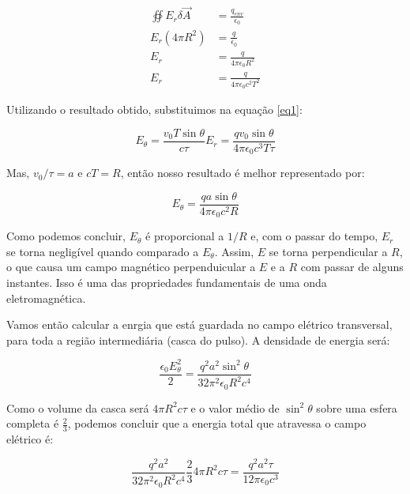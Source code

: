 \documentclass[12pt, letterpaper]{article}
\begin{document}
    \begin{equation} \label{eq2}
    \begin{split}
        \oiint E_r \delta \vec{A} &= \frac{q_{env}}{\epsilon_0} \\
        E_r(4\pi R^2) &= \frac{q}{\epsilon_0} \\
        E_r &= \frac{q}{4\pi\epsilon_0R^2} \\
        E_r &= \frac{q}{4\pi\epsilon_0c^2T^2} 
    \end{split}
    \end{equation}

    Utilizando o resultado obtido, substituimos na equação \ref{eq1}:

    \begin{equation} \label{eq3}
        E_\theta = \frac{v_0T\sin{\theta}}{c\tau}E_r = \frac{qv_0\sin{\theta}}{4\pi\epsilon_0c^3T\tau}
    \end{equation}

    Mas, $v_0 / \tau = a$ e $cT = R$, então nosso resultado é melhor representado por:

    \begin{equation} \label{eq4}
        E_\theta = \frac{qa\sin{\theta}}{4\pi\epsilon_0c^2R}
    \end{equation}

    Como podemos concluir, $E_\theta$ é proporcional a $1/R$ e, com o passar do tempo, $E_r$ se torna negligível quando comparado a $E_\theta$. Assim, $E$ se torna perpendicular a $R$, o que causa um campo magnético perpenduicular a $E$ e a $R$ com passar de alguns instantes. Isso é uma das propriedades fundamentais de uma onda eletromagnética.

    Vamos então calcular a enrgia que está guardada no campo elétrico transversal, para toda a região intermediária (casca do pulso). A densidade de energia será:

    \begin{equation} \label{eq5}
        \frac{\epsilon_0E_\theta^2}{2} = \frac{q^2a^2\sin^2{\theta}}{32\pi^2\epsilon_0R^2c^4}
    \end{equation}    

    Como o volume da casca será $4\pi R^2 c\tau$ e o valor médio de $\sin^2{\theta}$ sobre uma esfera completa é $\frac{2}{3}$, podemos concluir que a energia total que atravessa o campo elétrico é:

    \begin{equation} \label{eq6}
        \frac{q^2a^2}{32\pi^2\epsilon_0R^2c^4}\frac{2}{3}4\pi R^2c\tau = \frac{q^2a^2\tau}{12\pi\epsilon_0c^3}
    \end{equation}    
\end{document}

